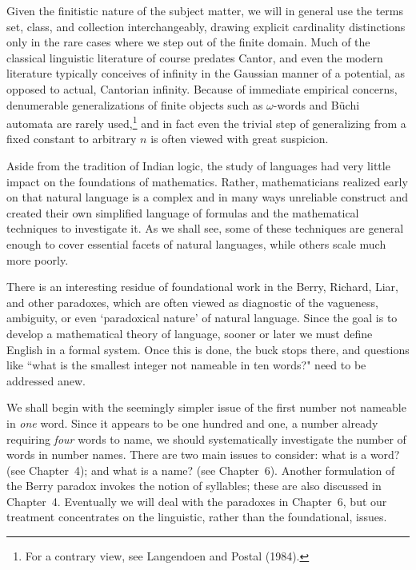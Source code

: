 Given the finitistic nature of the subject matter, we will in general use the
terms set, class, and collection interchangeably, drawing explicit cardinality
distinctions only in the rare cases where we step out of the finite domain.
Much of the classical linguistic literature of course predates Cantor, and
even the modern literature typically conceives of infinity in the Gaussian
manner of a potential, as opposed to actual, Cantorian infinity. Because of
immediate empirical concerns, denumerable generalizations of finite objects
such as $\omega$-words and B\"{u}chi automata are rarely used,\footnote{For a
contrary view, see Langendoen and Postal (1984).\nocite{Langendoen:1984}} and
in fact even the trivial step of generalizing from a fixed constant to
arbitrary $n$ is often viewed with great suspicion. 

Aside from the tradition of Indian logic, the study of languages had very
little impact on the foundations of mathematics. Rather, mathematicians
realized early on that natural language is a complex and in many ways
unreliable construct and created their own simplified language of formulas
and the mathematical techniques to investigate it. As we shall see, some of
these techniques are general enough to cover essential facets of natural
languages, while others scale much more poorly.

There is an interesting residue of foundational work in the Berry, Richard,
Liar, and other paradoxes, which are often viewed as diagnostic of the
vagueness, ambiguity, or even `paradoxical nature' of natural language. Since
the goal is to develop a mathematical theory of language, sooner or later we
must define English in a formal system. Once this is done, the buck stops
there, and questions like ``what is the smallest integer not nameable in ten
words?" need to be addressed anew.   

We shall begin with the seemingly simpler issue of the first number not
nameable in {\it one} word.  Since it appears to be one hundred and one, a
number already requiring {\it four} words to name, we should systematically
investigate the number of words in number names. There are two main issues to
consider: what is a word? (see Chapter~4); and what is a name? (see
Chapter~6).  Another formulation of the Berry paradox invokes the notion of
syllables; these are also discussed in Chapter~4. Eventually we will deal with
the paradoxes in Chapter~6, but our treatment concentrates on the linguistic,
rather than the foundational, issues.

